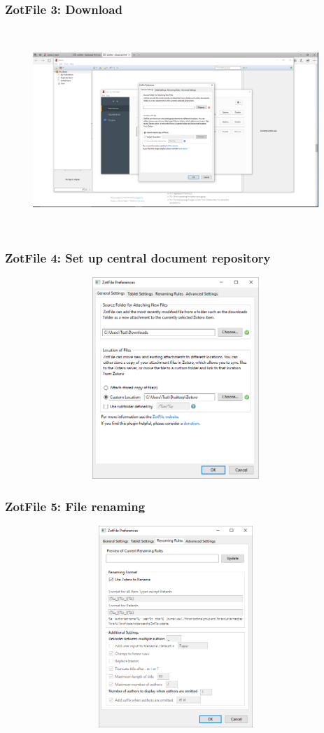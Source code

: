 \documentclass[12pt]{beamer}
\begin{document}
\begin{frame} \frametitle{ZotFile 3: Download} \begin{figure}[!h] \centering
	\includegraphics[height=3in, width = 4.25in,keepaspectratio]{zotero/zotfile_3.png}
\end{figure} \end{frame}

\begin{frame} \frametitle{ZotFile 4: Set up central document repository} \begin{figure}[!h] \centering
	\includegraphics[height=3in, width = 4.25in,keepaspectratio]{zotero/zotfile_4.png}
\end{figure} \end{frame}

\begin{frame} \frametitle{ZotFile 5: File renaming} \begin{figure}[!h] \centering
	\includegraphics[height=3in, width = 4.25in,keepaspectratio]{zotero/zotfile_5.png}
\end{figure} \end{frame}
\end{document}
